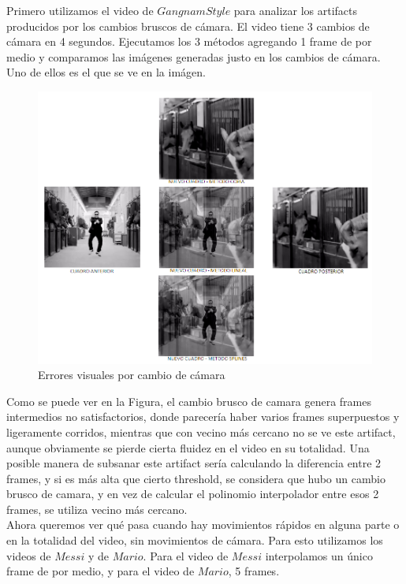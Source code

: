 Primero utilizamos el video de $Gangnam Style$ para analizar los artifacts producidos por los cambios bruscos de cámara. El video tiene 3 cambios de cámara en 4 segundos. Ejecutamos los 3 métodos agregando 1 frame de por medio y comparamos las imágenes generadas justo en los cambios de cámara. Uno de ellos es el que se ve en la imágen. 

\newpage

\begin{figure}[h!]
  \centering
    \includegraphics[scale= 0.5]{imagenes/gangman.png}
  \caption{Errores visuales por cambio de cámara}
\end{figure}


Como se puede ver en la Figura, el cambio brusco de camara genera frames intermedios no satisfactorios, donde parecería haber varios frames superpuestos y ligeramente corridos, mientras que con vecino más cercano no se ve este artifact, aunque obviamente se pierde cierta fluidez en el video en su totalidad.
Una posible manera de subsanar este artifact sería calculando la diferencia entre 2 frames, y si es más alta que cierto threshold, se considera que hubo un cambio brusco de camara, y en vez de calcular el polinomio interpolador entre esos 2 frames, se utiliza vecino más cercano.\\

Ahora queremos ver qué pasa cuando hay movimientos rápidos en alguna parte o en la totalidad del video, sin movimientos de cámara. Para esto utilizamos los videos de $Messi$ y de $Mario$. Para el video de $Messi$ interpolamos un único frame de por medio, y para el video de $Mario$, 5 frames. 

